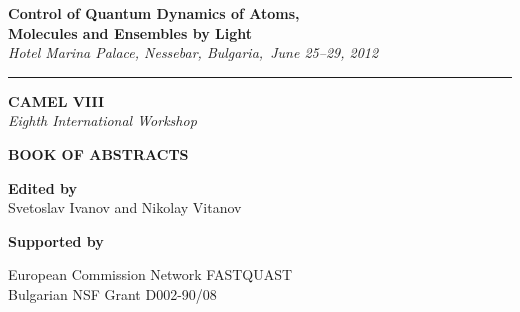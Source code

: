 \thispagestyle{empty}



\begin{center}

 {\LARGE \textsf{\textbf{Control of Quantum Dynamics of Atoms,}\\ \vspace{2mm} \textbf{Molecules and Ensembles by Light} }}\\ \vspace{2mm}
{\Large \emph{Hotel Marina Palace, Nessebar, Bulgaria,\ June 25--29, 2012}}

\vspace{3mm}

\hrule

\vspace{25mm}

{\fontsize{40}{48}\selectfont \textsf{\textbf{CAMEL VIII}}}\\
\vspace{5mm}
{\LARGE \emph{Eighth International Workshop}}\\

\vspace{25mm}

{\fontsize{36}{40}\selectfont \textsf{\textbf{BOOK OF  ABSTRACTS}}}\\

\vspace{15mm}

\Large{\textbf{Edited by} \\ Svetoslav Ivanov and Nikolay Vitanov}

\vspace{60mm}

{\Large \textbf{Supported by}

European Commission Network FASTQUAST\\
Bulgarian NSF Grant D002-90/08

}




\end{center}


